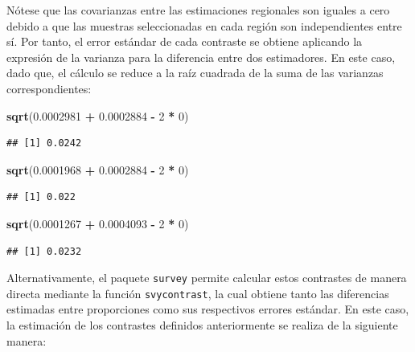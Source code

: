 \documentclass[
  spanish,
  12pt,
]{book}
\newenvironment{Shaded}{\begin{snugshade}}{\end{snugshade}}
\newcommand{\DecValTok}[1]{\textcolor[rgb]{0.00,0.00,0.81}{#1}}
\newcommand{\FloatTok}[1]{\textcolor[rgb]{0.00,0.00,0.81}{#1}}
\newcommand{\FunctionTok}[1]{\textcolor[rgb]{0.13,0.29,0.53}{\textbf{#1}}}
\newcommand{\NormalTok}[1]{#1}
\newcommand{\SpecialCharTok}[1]{\textcolor[rgb]{0.81,0.36,0.00}{\textbf{#1}}}
\begin{document}
Nótese que las covarianzas entre las estimaciones regionales son iguales a cero debido a que las muestras seleccionadas en cada región son independientes entre sí. Por tanto, el error estándar de cada contraste se obtiene aplicando la expresión de la varianza para la diferencia entre dos estimadores. En este caso, dado que, el cálculo se reduce a la raíz cuadrada de la suma de las varianzas correspondientes:

\begin{Shaded}
\begin{Highlighting}[]
\FunctionTok{sqrt}\NormalTok{(}\FloatTok{0.0002981} \SpecialCharTok{+} \FloatTok{0.0002884} \SpecialCharTok{{-}} \DecValTok{2} \SpecialCharTok{*} \DecValTok{0}\NormalTok{)}
\end{Highlighting}
\end{Shaded}

\begin{verbatim}
## [1] 0.0242
\end{verbatim}

\begin{Shaded}
\begin{Highlighting}[]
\FunctionTok{sqrt}\NormalTok{(}\FloatTok{0.0001968} \SpecialCharTok{+} \FloatTok{0.0002884} \SpecialCharTok{{-}} \DecValTok{2} \SpecialCharTok{*} \DecValTok{0}\NormalTok{)}
\end{Highlighting}
\end{Shaded}

\begin{verbatim}
## [1] 0.022
\end{verbatim}

\begin{Shaded}
\begin{Highlighting}[]
\FunctionTok{sqrt}\NormalTok{(}\FloatTok{0.0001267} \SpecialCharTok{+} \FloatTok{0.0004093} \SpecialCharTok{{-}} \DecValTok{2} \SpecialCharTok{*} \DecValTok{0}\NormalTok{)}
\end{Highlighting}
\end{Shaded}

\begin{verbatim}
## [1] 0.0232
\end{verbatim}

Alternativamente, el paquete \texttt{survey} permite calcular estos contrastes de manera directa mediante la función \texttt{svycontrast}, la cual obtiene tanto las diferencias estimadas entre proporciones como sus respectivos errores estándar. En este caso, la estimación de los contrastes definidos anteriormente se realiza de la siguiente manera:
\end{document}
